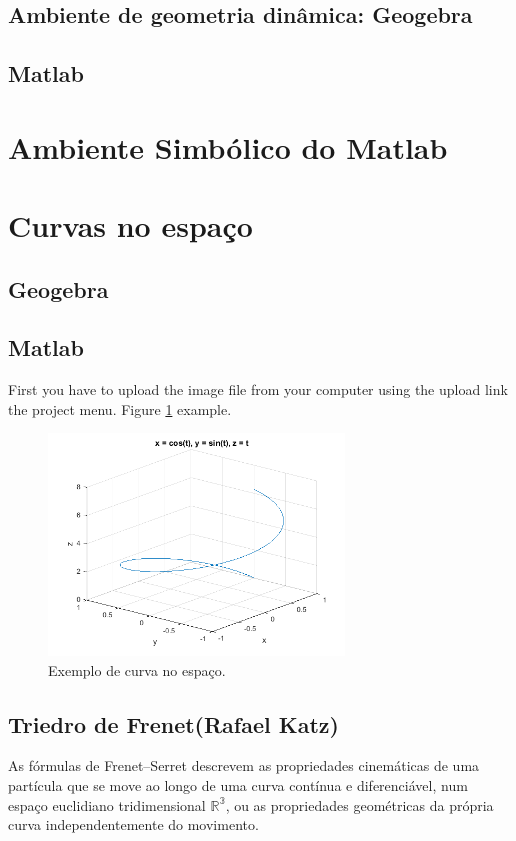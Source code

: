 \documentclass[a4paper]{article}
\begin{document}
\subsection{Ambiente de geometria dinâmica: Geogebra}

\subsection{Matlab}

\section{Ambiente Simbólico do Matlab}

\section{Curvas no espaço}
\subsection{Geogebra}

\subsection{Matlab}



First you have to upload the image file from your computer using the upload link the project menu.  Figure \ref{fig:curvaEspaco} example.

\begin{figure}[ht]
\centering
\includegraphics[width=0.7\textwidth]{curvaEspaco.png}
\caption{\label{fig:curvaEspaco} Exemplo de curva no espaço.}
\end{figure}

\subsection{Triedro de Frenet(Rafael Katz)}
As fórmulas de Frenet–Serret descrevem as propriedades cinemáticas de uma partícula que se move ao longo de uma curva contínua e diferenciável,  num espaço euclidiano tridimensional $\mathbb{R^3}$, ou as propriedades geométricas da própria curva independentemente do movimento.
\end{document}
